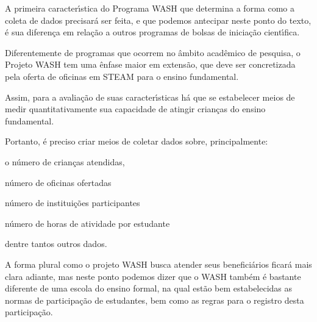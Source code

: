 \documentclass[
12pt,		%
openright,	%
twoside,  %
a4paper,			%
chapter=TITLE,		%
english,			%
french,				%
spanish,			%
brazil				%
]{USPSC-classe/USPSC_RedarTex}
\begin{document}
A primeira caracter\'{\i}stica do Programa WASH que determina a forma como a coleta de dados precisar\'a ser feita, e que podemos antecipar neste ponto do texto, \'e sua diferen\c{c}a em rela\c{c}\~ao a outros programas de bolsas de inicia\c{c}\~ao cient\'{\i}fica.








Diferentemente de programas que ocorrem no \^ambito acad\^emico de pesquisa, o Projeto WASH tem uma \^enfase maior em extens\~ao, que deve ser concretizada pela oferta de oficinas em STEAM para o ensino fundamental.








Assim, para a avalia\c{c}\~ao de suas caracter\'{\i}sticas h\'a que se estabelecer meios de medir quantitativamente sua capacidade de atingir crian\c{c}as do ensino fundamental.








Portanto, \'e preciso criar meios de coletar dados sobre, principalmente:









\begin{alineas}
\item o n\'umero de crian\c{c}as atendidas,
\item n\'umero de oficinas ofertadas
\item n\'umero de institui\c{c}\~oes participantes
\item n\'umero de horas de atividade por estudante
\end{alineas}

dentre tantos outros dados.








A forma plural como o projeto WASH busca atender seus benefici\'arios ficar\'a mais clara adiante, mas neste ponto podemos dizer que o WASH tamb\'em \'e bastante diferente de uma escola do ensino formal, na qual est\~ao bem estabelecidas as normas de participa\c{c}\~ao de estudantes, bem como as regras para o registro desta participa\c{c}\~ao.
\end{document}
